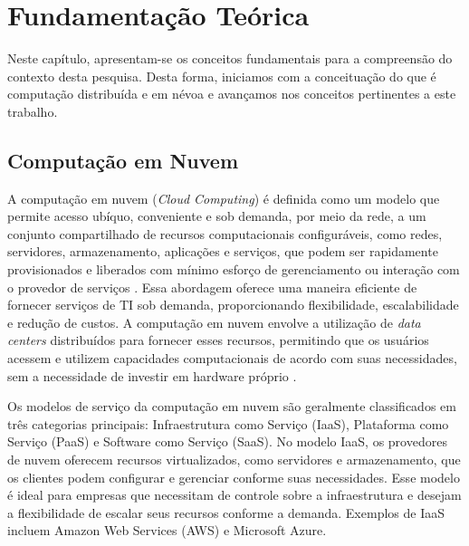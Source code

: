 \chapter{Fundamentação Teórica}\label{cap:fundamentacao_teorica}

Neste capítulo, apresentam-se os conceitos fundamentais para a compreensão do contexto desta pesquisa. Desta forma, iniciamos com a conceituação do que é computação distribuída e em névoa e avançamos nos conceitos pertinentes a este trabalho.

\section{Computação em Nuvem}

A computação em nuvem (\textit{Cloud Computing}) é definida como um modelo que permite acesso ubíquo, conveniente e sob demanda, por meio da rede, a um conjunto compartilhado de recursos computacionais configuráveis, como redes, servidores, armazenamento, aplicações e serviços, que podem ser rapidamente provisionados e liberados com mínimo esforço de gerenciamento ou interação com o provedor de serviços \cite{mell2011}. Essa abordagem oferece uma maneira eficiente de fornecer serviços de \gls{TI} sob demanda, proporcionando flexibilidade, escalabilidade e redução de custos. A computação em nuvem envolve a utilização de \textit{data centers} distribuídos para fornecer esses recursos, permitindo que os usuários acessem e utilizem capacidades computacionais de acordo com suas necessidades, sem a necessidade de investir em hardware próprio \cite{tanenbaum2015}.

Os modelos de serviço da computação em nuvem são geralmente classificados em três categorias principais: Infraestrutura como Serviço (\gls{IaaS}), Plataforma como Serviço (\gls{PaaS}) e Software como Serviço (\gls{SaaS}). No modelo \gls{IaaS}, os provedores de nuvem oferecem recursos virtualizados, como servidores e armazenamento, que os clientes podem configurar e gerenciar conforme suas necessidades. Esse modelo é ideal para empresas que necessitam de controle sobre a infraestrutura e desejam a flexibilidade de escalar seus recursos conforme a demanda. Exemplos de IaaS incluem Amazon Web Services (\gls{AWS}) e Microsoft Azure.

